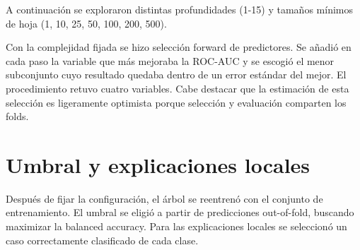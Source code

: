 A continuación se exploraron distintas profundidades (1-15) y tamaños mínimos de
hoja (1, 10, 25, 50, 100, 200, 500). 


Con la complejidad fijada se hizo selección forward de predictores. Se añadió
en cada paso la variable que más mejoraba la ROC-AUC y se escogió el menor
subconjunto cuyo resultado quedaba dentro de un error estándar del mejor. El
procedimiento retuvo cuatro variables. Cabe destacar que la  estimación de esta selección es 
ligeramente optimista porque selección y evaluación comparten los folds.

\section{Umbral y explicaciones locales}

Después de fijar la configuración, el árbol se reentrenó con el conjunto de
entrenamiento. El umbral se eligió a partir de predicciones out-of-fold,
buscando maximizar la balanced accuracy. Para las explicaciones locales se
seleccionó un caso correctamente clasificado de cada clase.
